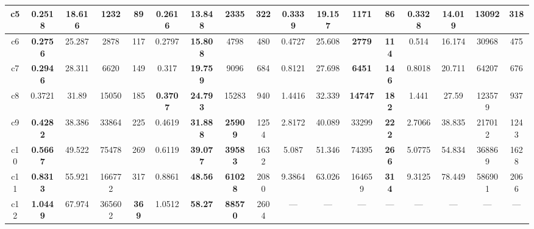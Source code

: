 \begin{tabular}{||c||c|c|c|c|c|c|c|c|c|c|c|c|c|c|c|c||}
\hline%
c5&\small{\textbf{0.2518}}&\small{18.616}&\small{1232}&\small{89}&\small{0.2616}&\small{\textbf{13.848}}&\small{2335}&\small{322}&\small{0.3339}&\small{19.157}&\small{\textbf{1171}}&\small{\textbf{86}}&\small{0.3328}&\small{14.019}&\small{13092}&\small{318}\\%
\hline%
c6&\small{\textbf{0.2756}}&\small{25.287}&\small{2878}&\small{117}&\small{0.2797}&\small{\textbf{15.808}}&\small{4798}&\small{480}&\small{0.4727}&\small{25.608}&\small{\textbf{2779}}&\small{\textbf{114}}&\small{0.514}&\small{16.174}&\small{30968}&\small{475}\\%
\hline%
c7&\small{\textbf{0.2946}}&\small{28.311}&\small{6620}&\small{149}&\small{0.317}&\small{\textbf{19.759}}&\small{9096}&\small{684}&\small{0.8121}&\small{27.698}&\small{\textbf{6451}}&\small{\textbf{146}}&\small{0.8018}&\small{20.711}&\small{64207}&\small{676}\\%
\hline%
c8&\small{0.3721}&\small{31.89}&\small{15050}&\small{185}&\small{\textbf{0.3707}}&\small{\textbf{24.793}}&\small{15283}&\small{940}&\small{1.4416}&\small{32.339}&\small{\textbf{14747}}&\small{\textbf{182}}&\small{1.441}&\small{27.59}&\small{123579}&\small{937}\\%
\hline%
c9&\small{\textbf{0.4282}}&\small{38.386}&\small{33864}&\small{225}&\small{0.4619}&\small{\textbf{31.888}}&\small{\textbf{25909}}&\small{1254}&\small{2.8172}&\small{40.089}&\small{33299}&\small{\textbf{222}}&\small{2.7066}&\small{38.835}&\small{217012}&\small{1243}\\%
\hline%
c10&\small{\textbf{0.5667}}&\small{49.522}&\small{75478}&\small{269}&\small{0.6119}&\small{\textbf{39.077}}&\small{\textbf{39583}}&\small{1632}&\small{5.087}&\small{51.346}&\small{74395}&\small{\textbf{266}}&\small{5.0775}&\small{54.834}&\small{368869}&\small{1628}\\%
\hline%
c11&\small{\textbf{0.8313}}&\small{55.921}&\small{166772}&\small{317}&\small{0.8861}&\small{\textbf{48.56}}&\small{\textbf{61028}}&\small{2080}&\small{9.3864}&\small{63.026}&\small{164659}&\small{\textbf{314}}&\small{9.3125}&\small{78.449}&\small{586901}&\small{2066}\\%
\hline%
c12&\small{\textbf{1.0449}}&\small{67.974}&\small{365602}&\small{\textbf{369}}&\small{1.0512}&\small{\textbf{58.27}}&\small{\textbf{88570}}&\small{2604}&\small{---}&\small{---}&\small{---}&\small{---}&\small{---}&\small{---}&\small{---}&\small{---}\\%
\hline%
\end{tabular}